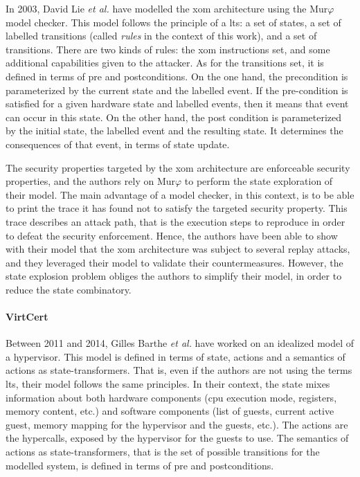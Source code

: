 In 2003, David Lie \emph{et al.} have modelled the \ac{xom} architecture using
the Mur$\varphi$ model checker.
%
This model follows the principle of a \ac{lts}: a set of states, a set of
labelled transitions (called \emph{rules} in the context of this work), and a
set of transitions.
%
There are two kinds of rules: the \ac{xom} instructions set, and some additional
capabilities given to the attacker.
%
As for the transitions set, it is defined in terms of pre and postconditions.
%
On the one hand, the precondition is parameterized by the current state and the
labelled event.
%
If the pre-condition is satisfied for a given hardware state and labelled events,
then it means that event can occur in this state.
%
On the other hand, the post condition is parameterized by the initial state, the
labelled event and the resulting state.
%
It determines the consequences of that event, in terms of state update.

The security properties targeted by the \ac{xom} architecture are enforceable
security properties, and the authors rely on Mur$\varphi$ to perform the state
exploration of their model.
%
The main advantage of a model checker, in this context, is to be able to print
the trace it has found not to satisfy the targeted security property.
%
This trace describes an attack path, that is the execution steps to reproduce in
order to defeat the security enforcement.
%
Hence, the authors have been able to show with their model that the \ac{xom}
architecture was subject to several replay attacks, and they leveraged their
model to validate their countermeasures.
%
However, the state explosion problem obliges the authors to simplify their
model, in order to reduce the state combinatory.

\paragraph{VirtCert}
%
Between 2011 and 2014, Gilles Barthe \emph{et al.} have worked on an idealized
model of a hypervisor.
%
This model is defined in terms of state, actions and a semantics of actions as
state-transformers.
%
That is, even if the authors are not using the terms \ac{lts}, their model
follows the same principles.
%
In their context, the state mixes information about both hardware components
(\ac{cpu} execution mode, registers, memory content, etc.) and software
components (list of guests, current active guest, memory mapping for the
hypervisor and the guests, etc.).
%
The actions are the hypercalls, exposed by the hypervisor for the guests to use.
%
The semantics of actions as state-transformers, that is the set of possible
transitions for the modelled system, is defined in terms of pre and postconditions.

